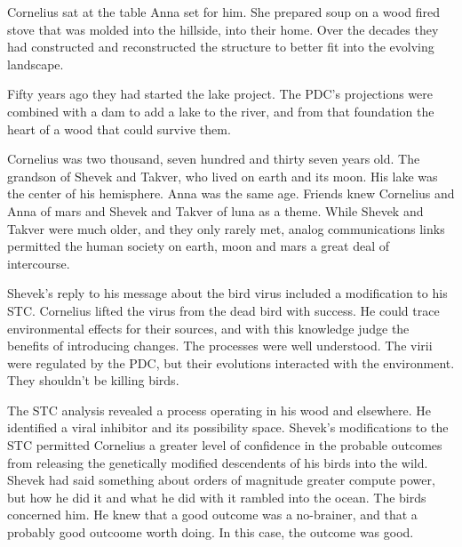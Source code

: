 Cornelius sat at the table Anna set for him.  She prepared soup on a
wood fired stove that was molded into the hillside, into their home.
Over the decades they had constructed and reconstructed the structure
to better fit into the evolving landscape.  

Fifty years ago they had started the lake project.  The PDC's projections
were combined with a dam to add a lake to the river, and from that
foundation the heart of a wood that could survive them.

\bigskip

Cornelius was two thousand, seven hundred and thirty seven years old.
The grandson of Shevek and Takver, who lived on earth and its moon.
His lake was the center of his hemisphere.  Anna was the same age.
Friends knew Cornelius and Anna of mars and Shevek and Takver of luna
as a theme.  While Shevek and Takver were much older, and they only
rarely met, analog communications links permitted the human society on
earth, moon and mars a great deal of intercourse.

\bigskip

Shevek's reply to his message about the bird virus included a
modification to his STC.  Cornelius lifted the virus from the dead
bird with success.  He could trace environmental effects for their
sources, and with this knowledge judge the benefits of introducing
changes.  The processes were well understood.  The virii were
regulated by the PDC, but their evolutions interacted with the
environment.  They shouldn't be killing birds.

The STC analysis revealed a process operating in his wood and
elsewhere.  He identified a viral inhibitor and its possibility space.
Shevek's modifications to the STC permitted Cornelius a greater level
of confidence in the probable outcomes from releasing the genetically
modified descendents of his birds into the wild.  Shevek had said
something about orders of magnitude greater compute power, but how he
did it and what he did with it rambled into the ocean.  The birds
concerned him.  He knew that a good outcome was a no-brainer, and that
a probably good outcoome worth doing.  In this case, the outcome was
good.


\bigskip


\bye
